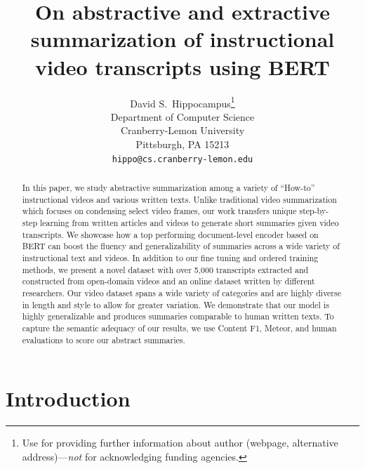 \documentclass{article}
\title{On abstractive and extractive summarization of instructional video transcripts using BERT}
\author{%
  David S.~Hippocampus\thanks{Use  for providing further information
    about author (webpage, alternative address)---\emph{not} for acknowledging
    funding agencies.} \\
  Department of Computer Science\\
  Cranberry-Lemon University\\
  Pittsburgh, PA 15213 \\
  \texttt{hippo@cs.cranberry-lemon.edu} \\
}
\begin{document}
\maketitle

\begin{abstract}
In this paper, we study abstractive summarization among a variety of “How-to” instructional videos and various written texts. Unlike traditional video summarization which focuses on condensing select video frames, our work transfers unique step-by-step learning from written articles and videos to generate short summaries given video transcripts. We showcase how a top performing document-level encoder based on BERT can boost the fluency and generalizability of summaries across a wide variety of instructional text and videos. In addition to our fine tuning and ordered training methods, we present a novel dataset with over 5,000 transcripts extracted and constructed from open-domain videos and an online dataset written by different researchers. Our video dataset spans a wide variety of categories and are highly diverse in length and style to allow for greater variation. We demonstrate that our model is highly generalizable and produces summaries comparable to human written texts. To capture the semantic adequacy of our results, we use Content F1, Meteor, and human evaluations to score our abstract summaries.

\end{abstract}

\section{Introduction}
 
\end{document}
